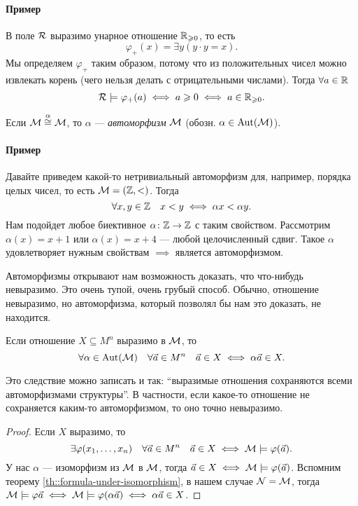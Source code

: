 \paragraph{Пример}
В поле $\mathcal{R}$ выразимо унарное отношение $\mathbb{R}_{\geqslant 0}$, то есть
$$
    \varphi_{+}(x) = \exists y (y \cdot y = x).
$$
Мы определяем $\varphi_{+}$ таким образом, потому что из положительных чисел можно извлекать корень (чего нельзя делать с отрицательными числами).
Тогда $\forall a \in \mathbb{R}$
$$
    \mathcal{R} \models \varphi_{+}(a) \iff a \geqslant 0 \iff a\in \mathbb{R}_{\geqslant 0}. 
$$

\begin{definition}
    Если $\mathcal{M} \overset{\alpha}{\cong} \mathcal{M}$, то $\alpha$ --- {\it автоморфизм} $\mathcal{M}$ (обозн. $\alpha \in \operatorname{Aut}(\mathcal{M})$).
\end{definition}

\paragraph{Пример}
Давайте приведем какой-то нетривиальный автоморфизм для, например, порядка целых чисел, то есть $\mathcal{M} = (\mathbb{Z}, <)$.
Тогда
$$
    \forall x, y \in \mathbb{Z} \quad x < y \iff \alpha x < \alpha y.
$$
Нам подойдет любое биективное $\alpha \colon \mathbb{Z} \to \mathbb{Z}$ с таким свойством.
Рассмотрим $\alpha(x) = x + 1$ или $\alpha(x) = x + 4$ --- любой целочисленный сдвиг.
Такое $\alpha$ удовлетворяет нужным свойствам $\implies$ является автоморфизмом.

Автоморфизмы открывают нам возможность доказать, что что-нибудь невыразимо.
Это очень тупой, очень грубый способ.
Обычно, отношение невыразимо, но автоморфизма, который позволял бы нам это доказать, не находится.

\begin{corollary}
    Если отношение $X \subseteq M^{n}$ выразимо в $\mathcal{M}$, то
    $$
        \forall \alpha \in \operatorname{Aut}(\mathcal{M}) \quad \forall \vec{a} \in M^{n} \quad \vec{a} \in X \iff \alpha \vec{a} \in X.
    $$ 
\end{corollary}

Это следствие можно записать и так: \enquote{выразимые отношения сохраняются всеми автоморфизмами структуры}.
В частности, если какое-то отношение не сохраняется каким-то автоморфизмом, то оно точно невыразимо.

\begin{proof}
    Если $X$ выразимо, то
    $$
        \exists \varphi(x_{1}, \ldots, x_{n}) \quad \forall \vec{a} \in M^{n} \quad \vec{a} \in X \iff \mathcal{M} \models \varphi(\vec{a}).
    $$
    У нас $\alpha$ --- изоморфизм из $\mathcal{M}$ в $\mathcal{M}$, тогда $\vec{a} \in X \iff \mathcal{M} \models \varphi(\vec{a})$.
    Вспомним теорему \ref{th::formula-under-isomorphism}, в нашем случае $\mathcal{N} = \mathcal{M}$, тогда $\mathcal{M} \models \varphi{\vec{a}} \iff \mathcal{M} \models \varphi(\alpha \vec{a}) \iff \alpha \vec{a} \in X$.
\end{proof}

